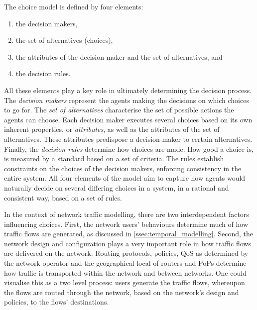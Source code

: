 The choice model is defined by four elements:
\begin{enumerate}
\item the decision makers,
\item the set of alternatives (choices),
\item the attributes of the decision maker and the set of alternatives, and
\item the decision rules.
\end{enumerate}
All these elements play a key role in ultimately determining the decision process. The \emph{decision makers} represent the 
agents making the decisions on which choices to go for. The \emph{set of alternatives} characterise the set of possible 
actions the agents can choose. Each decision maker executes several choices based on its own inherent properties, or
\emph{attributes}, as well as the attributes of the set of alternatives. These attributes predispose a decision maker to
certain alternatives. Finally, the \emph{decision rules} determine how choices are made. How good a choice is, is measured
by a standard based on a set of criteria. The rules establish constraints on the choices of the
decision makers, enforcing consistency in the entire system. All four elements of the model aim to capture how
agents would naturally decide on several differing choices in a system, in a rational and consistent way, based on a set of rules.

In the context of network traffic modelling, there are two interdependent factors influencing choices.
First, the network users' behaviours determine much of how traffic flows are generated, as discussed in  
\autoref{ssec:temporal_modelling}. Second, the network design and configuration plays a very important role in how traffic flows 
are delivered on
the network. Routing protocols, policies, QoS as determined by the network operator and the geographical local
of routers and PoPs determine how traffic is transported within the network and between networks. One could visualise this as
a two level process: users generate the traffic flows, whereupon the flows are routed through the network, based on the network's 
design and policies, to the flows' destinations.

